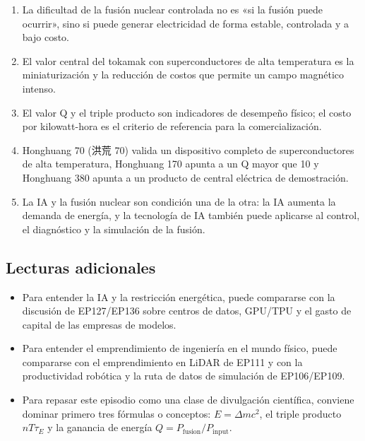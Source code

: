 \documentclass[a4paper]{article}
\begin{document}
\begin{enumerate}
\item La dificultad de la fusión nuclear controlada no es «si la fusión puede ocurrir», sino si puede generar electricidad de forma estable, controlada y a bajo costo.
\item El valor central del tokamak con superconductores de alta temperatura es la miniaturización y la reducción de costos que permite un campo magnético intenso.
\item El valor Q y el triple producto son indicadores de desempeño físico; el costo por kilowatt-hora es el criterio de referencia para la comercialización.
\item Honghuang 70 (洪荒 70) valida un dispositivo completo de superconductores de alta temperatura, Honghuang 170 apunta a un Q mayor que 10 y Honghuang 380 apunta a un producto de central eléctrica de demostración.
\item La IA y la fusión nuclear son condición una de la otra: la IA aumenta la demanda de energía, y la tecnología de IA también puede aplicarse al control, el diagnóstico y la simulación de la fusión.
\end{enumerate}

\subsection{Lecturas adicionales}

\begin{itemize}
\item Para entender la IA y la restricción energética, puede compararse con la discusión de EP127/EP136 sobre centros de datos, GPU/TPU y el gasto de capital de las empresas de modelos.
\item Para entender el emprendimiento de ingeniería en el mundo físico, puede compararse con el emprendimiento en LiDAR de EP111 y con la productividad robótica y la ruta de datos de simulación de EP106/EP109.
\item Para repasar este episodio como una clase de divulgación científica, conviene dominar primero tres fórmulas o conceptos: $E=\Delta mc^2$, el triple producto $nT\tau_E$ y la ganancia de energía $Q=P_{\mathrm{fusion}}/P_{\mathrm{input}}$.
\end{itemize}
\end{document}
